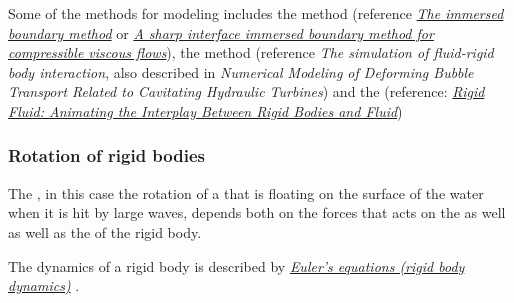 Some of the methods for modeling \FSI includes the \IB method (reference \textit{\href{http://www4.ncsu.edu/~zhilin/TEACHING/MA798Z/Peskin1.pdf}{The immersed boundary method}} or \textit{\href{http://www.cecs.wright.edu/~haibo.dong/wp-content/themes/publications/IBM_JCP_2007.pdf}{A sharp interface immersed boundary method for compressible viscous flows}}), the \VOS method (reference \textit{The simulation of fluid-rigid body interaction}, also described in \textit{Numerical Modeling of Deforming Bubble Transport Related to Cavitating Hydraulic Turbines}) and the  (reference: \textit{\href{http://www.amath.unc.edu/Faculty/mucha/Reprints/siggraph04.pdf}{Rigid Fluid: Animating the Interplay Between Rigid Bodies and Fluid}})

\subsubsection{Rotation of rigid bodies}

The , in this case the rotation of a \ship that is floating on the surface of the water when it is hit by large waves, depends both on the forces that acts on the  as well as well as the   of the rigid body.

The dynamics of a rigid body is described by \textit{\href{http://en.wikipedia.org/wiki/Euler\%27s_equations_\%28rigid_body_dynamics\%29}{Euler's equations (rigid body dynamics)}} \citep{temp}.



